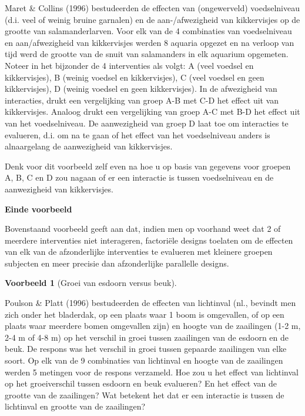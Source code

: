 \documentclass[
  12pt,dutch,coursenotes]{book}
\theoremstyle{definition}
\theoremstyle{definition}
\newtheorem{example}{Voorbeeld}[chapter]
\theoremstyle{definition}
\theoremstyle{definition}
\theoremstyle{remark}
\begin{document}
Maret \& Collins (1996) bestudeerden de effecten van (ongewerveld) voedselniveau (d.i. veel of weinig bruine garnalen) en de aan-/afwezigheid van kikkervisjes op de grootte van salamanderlarven. Voor elk van de 4 combinaties van voedselniveau en aan/afwezigheid van kikkervisjes werden 8 aquaria opgezet en na verloop van tijd werd de grootte van de snuit van salamanders in elk aquarium opgemeten. Noteer in het bijzonder de 4 interventies als volgt: A (veel voedsel en kikkervisjes), B (weinig voedsel en kikkervisjes), C (veel voedsel en geen kikkervisjes), D (weinig voedsel en geen kikkervisjes).
In de afwezigheid van interacties, drukt een vergelijking van groep A-B met C-D het effect uit
van kikkervisjes. Analoog drukt een vergelijking van groep A-C met B-D
het effect uit van het voedselniveau. De aanwezigheid van groep D laat toe om
interacties te evalueren, d.i. om na te gaan of het effect van het voedselniveau anders is alnaargelang de aanwezigheid van kikkervisjes.

Denk voor dit voorbeeld zelf even na hoe u op basis van gegevens voor
groepen A, B, C en D zou nagaan of er een interactie is tussen voedselniveau en
de aanwezigheid van kikkervisjes.

\textbf{Einde voorbeeld}

Bovenstaand voorbeeld geeft aan dat, indien men op voorhand weet dat 2 of meerdere interventies niet
interageren, factoriële designs toelaten om de effecten van elk van de
afzonderlijke interventies te evalueren met kleinere groepen subjecten en
meer precisie dan afzonderlijke parallelle designs.

\begin{example}[Groei van esdoorn versus beuk]
\protect\hypertarget{exm:unnamed-chunk-80}{}{\label{exm:unnamed-chunk-80} {} }
\end{example}

Poulson \& Platt (1996) bestudeerden de effecten van lichtinval (nl., bevindt men zich onder het bladerdak, op een plaats waar 1 boom is omgevallen, of op een plaats waar meerdere bomen omgevallen zijn) en hoogte van de zaailingen (1-2 m, 2-4 m of 4-8 m) op het verschil in groei tussen zaailingen van de esdoorn en de beuk. De respons was het verschil in groei tussen gepaarde zaailingen van elke soort. Op elk van de 9 combinaties van lichtinval en hoogte van de zaailingen werden 5 metingen voor de respons verzameld. Hoe zou
u het effect van lichtinval op het groeiverschil tussen esdoorn en beuk evalueren?
En het effect van de grootte van de zaailingen? Wat betekent het dat er een
interactie is tussen de lichtinval en grootte van de zaailingen?
\end{document}
